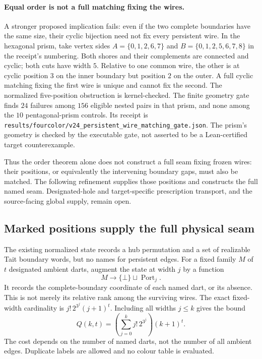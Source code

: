 \paragraph{Equal order is not a full matching fixing the wires.}
A stronger proposed implication fails: even if the two complete boundaries
have the same size, their cyclic bijection need not fix every persistent
wire.  In the hexagonal prism, take vertex sides
$A=\{0,1,2,6,7\}$ and $B=\{0,1,2,5,6,7,8\}$ in the receipt's
numbering.  Both shores and their complements are connected and cyclic;
both cuts have width $5$.  Relative to one common wire, the other is at
cyclic position $3$ on the inner boundary but position $2$ on the outer.
A full cyclic matching fixing the first wire is unique and cannot fix
the second.  The normalized five-position obstruction is kernel-checked.
The finite geometry gate finds $24$ failures among $156$ eligible nested
pairs in that prism, and none among the $10$ pentagonal-prism controls.
Its receipt is
\texttt{results/fourcolor/v24\_persistent\_wire\_matching\_gate.json}.
The prism's geometry is checked by the executable gate, not asserted to
be a Lean-certified target counterexample.

Thus the order theorem alone does not construct a full seam fixing frozen
wires: their positions, or equivalently the intervening boundary gaps,
must also be matched.  The following refinement supplies those positions
and constructs the full named seam.  Designated-hole and target-specific
prescription transport, and the source-facing global supply, remain open.
\subsection{Marked positions supply the full physical seam}
\label{sec:marked-seam-positions}

The existing normalized state records a hub permutation and a set of
realizable Tait boundary words, but no names for persistent edges.
For a fixed family $M$ of $t$ designated ambient darts, augment the state
at width $j$ by a function
\[
 M\longrightarrow \{\bot\}\sqcup\operatorname{Port}_j.
\]
It records the complete-boundary coordinate of each named dart, or its
absence.  This is not merely its relative rank among the surviving wires.
The exact fixed-width cardinality is
$j!\,2^{3^j}(j+1)^t$.  Including all widths $j\leq k$ gives the bound
\[
 Q(k,t)=\left(\sum_{j=0}^{k} j!\,2^{3^j}\right)(k+1)^t.
\]
The cost depends on the number of named darts, not the number of all
ambient edges.  Duplicate labels are allowed and no colour table is evaluated.

